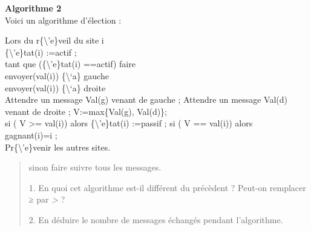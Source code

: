 \documentclass[
]{article}
\begin{document}
\textbf{Algorithme 2}\\
Voici un algorithme d'élection :

Lors du r\{\textbackslash'e\}veil du site i\\
\{\textbackslash'e\}tat(i) :=actif ;\\
tant que (\{\textbackslash'e\}tat(i) ==actif) faire\\
envoyer(val(i)) \{\textbackslash`a\} gauche\\
envoyer(val(i)) \{\textbackslash`a\} droite\\
Attendre un message Val(g) venant de gauche ; Attendre un message Val(d)
venant de droite ; V:=max\{Val(g), Val(d)\};\\
si ( V \textgreater= val(i)) alors \{\textbackslash'e\}tat(i) :=passif ;
si ( V == val(i)) alors\\
gagnant(i)=i ;\\
Pr\{\textbackslash'e\}venir les autres sites.

\begin{quote}
sinon faire suivre tous les messages.

1. En quoi cet algorithme est-il diﬀérent du précèdent ? Peut-on
remplacer \emph{≥} par \emph{\textgreater{}} ?

2. En déduire le nombre de messages échangés pendant l'algorithme.
\end{quote}
\end{document}
